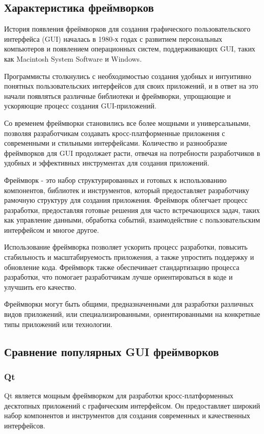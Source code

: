 \subsection{Характеристика фреймворков}

История появления фреймворков для создания графического пользовательского интерфейса (GUI) началась в 1980-х годах с развитием персональных компьютеров и появлением операционных систем, поддерживающих GUI, таких как Macintosh System Software и Windows.

Программисты столкнулись с необходимостью создания удобных и интуитивно понятных пользовательских интерфейсов для своих приложений, и в ответ на это начали появляться различные библиотеки и фреймворки, упрощающие и ускоряющие процесс создания GUI-приложений.

Со временем фреймворки становились все более мощными и универсальными, позволяя разработчикам создавать кросс-платформенные приложения с современными и стильными интерфейсами. Количество и разнообразие фреймворков для GUI продолжает расти, отвечая на потребности разработчиков в удобных и эффективных инструментах для создания приложений.

Фреймворк \cite{framework} - это набор структурированных и готовых к использованию компонентов, библиотек и инструментов, который предоставляет разработчику рамочную структуру для создания приложения. Фреймворк облегчает процесс разработки, предоставляя готовые решения для часто встречающихся задач, таких как управление данными, обработка событий, взаимодействие с пользовательским интерфейсом и многое другое.

Использование фреймворка позволяет ускорить процесс разработки, повысить стабильность и масштабируемость приложения, а также упростить поддержку и обновление кода. Фреймворк также обеспечивает стандартизацию процесса разработки, что помогает разработчикам лучше ориентироваться в коде и улучшить его качество.

Фреймворки могут быть общими, предназначенными для разработки различных видов приложений, или специализированными, ориентированными на конкретные типы приложений или технологии.

\subsection{Сравнение популярных GUI фреймворков}

\subsubsection {Qt}
Qt \cite{Qt} является мощным фреймворком для разработки кросс-платформенных десктопных приложений с графическим интерфейсом. Он предоставляет широкий набор компонентов и инструментов для создания современных и качественных интерфейсов.

